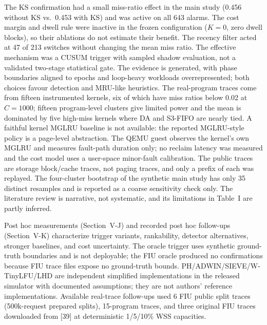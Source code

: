 \documentclass[journal,onecolumn]{IEEEtran}
\begin{document}
The KS confirmation had a small miss-ratio effect in the main study (0.456
without KS vs.\ 0.453 with KS) and was active on all 643 alarms. The cost
margin and dwell rule were inactive in the frozen configuration ($K = 0$, zero
dwell blocks), so their ablations do not estimate their benefit. The recency
filter acted at 47 of 213 switches without changing the mean miss ratio. The
effective mechanism was a CUSUM trigger with sampled shadow evaluation, not a
validated two-stage statistical gate. The evidence
is generated, with phase boundaries aligned to epochs and loop-heavy workloads
overrepresented; both choices favour detection and MRU-like heuristics. The
real-program traces come from fifteen instrumented kernels, six of which have
miss ratios below 0.02 at $C = 1000$; fifteen program-level clusters give
limited power and the mean is dominated by five high-miss kernels where DA and
S3-FIFO are nearly tied. A faithful kernel MGLRU baseline is not available:
the reported MGLRU-style policy is a page-level abstraction. The QEMU guest
observes the kernel's own MGLRU and measures fault-path duration only; no
reclaim latency was measured and the cost model uses a user-space minor-fault
calibration. The public traces are storage block/cache traces, not
paging traces, and only a prefix of each was replayed. The four-cluster
bootstrap of the synthetic main study has only 35 distinct resamples and is
reported as a coarse sensitivity check only. The literature review is
narrative, not systematic, and its limitations in Table~I are partly inferred.

Post hoc measurements (Section~V-J) and recorded post hoc follow-ups
(Section~V-K) characterize trigger variants, rankability,
detector alternatives, stronger baselines, and cost uncertainty. The oracle
trigger uses synthetic ground-truth boundaries and is not deployable; the FIU
oracle produced no confirmations because FIU trace files expose no
ground-truth bounds. PH/ADWIN/SIEVE/W-TinyLFU/LHD are independent simplified
implementations in the released simulator with documented assumptions; they
are not authors' reference implementations. Available real-trace follow-ups
used 6 FIU public split traces (500k-request prepared splits), 15-program
traces, and three original FIU traces downloaded from [39] at deterministic
1/5/10\% WSS capacities.
\end{document}
